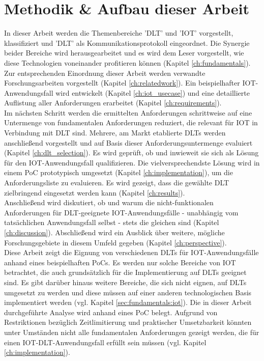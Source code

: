\section{Methodik \& Aufbau dieser Arbeit}
\label{sec:intro:methodology}
In dieser Arbeit werden die Themenbereiche '\ac{DLT}' und '\ac{IOT}' vorgestellt, klassifiziert und '\ac{DLT}' als Kommunikationsprotokoll eingeordnet. Die Synergie beider Bereiche wird herausgearbeitet und es wird dem Leser vorgestellt, wie diese Technologien voneinander profitieren können (Kapitel \ref{ch:fundamentals}).\\
Zur entsprechenden Einordnung dieser Arbeit werden verwandte Forschungsarbeiten vorgestellt (Kapitel \ref{ch:relatedwork}). Ein beispielhafter \ac{IOT}-Anwendungsfall wird entwickelt (Kapitel \ref{ch:iot_usecase}) und eine detaillierte Auflistung aller Anforderungen erarbeitet (Kapitel \ref{ch:requirements}).\\
Im nächsten Schritt werden die ermittelten Anforderungen schrittweise auf eine Untermenge von fundamentalen Anforderungen reduziert, die relevant für \ac{IOT} in Verbindung mit \ac{DLT} sind. Mehrere, am Markt etablierte \ac{DLT}s werden anschließend vorgestellt und auf Basis dieser Anforderungsuntermenge evaluiert (Kapitel \ref{ch:dlt_selection}). Es wird geprüft, ob und inwieweit sie sich als Lösung für den \ac{IOT}-Anwendungsfall qualifizieren. Die vielversprechendste Lösung wird in einem \ac{PoC} prototypisch umgesetzt (Kapitel \ref{ch:implementation}), um die Anforderungsliste zu evaluieren. Es wird gezeigt, dass die gewählte \ac{DLT} zielbringend eingesetzt werden kann (Kapitel \ref{ch:results}).\\
Anschließend wird diskutiert, ob und warum die nicht-funktionalen Anforderungen für \ac{DLT}-geeignete \ac{IOT}-Anwendungsfälle - unabhängig vom tatsächlichen Anwendungsfall selbst - stets die gleichen sind (Kapitel \ref{ch:discussion}). Abschließend wird ein Ausblick über weitere, mögliche Forschungsgebiete in diesem Umfeld gegeben (Kapitel \ref{ch:perspective}).\\

Diese Arbeit zeigt die Eignung von verschiedenen \ac{DLT}s für \ac{IOT}-Anwendungsfälle anhand eines beispielhaften \ac{PoC}s. Es werden nur solche Bereiche von \ac{IOT} betrachtet, die auch grundsätzlich für die Implementierung auf \ac{DLT}s geeignet sind. Es gibt darüber hinaus weitere Bereiche, die sich nicht eignen, auf \ac{DLT}s umgesetzt zu werden und diese müssen auf einer anderen technologischen Basis implementiert werden (vgl. Kapitel \ref{sec:fundamentals:iot}). Die in dieser Arbeit durchgeführte Analyse wird anhand eines \ac{PoC} belegt. Aufgrund von Restriktionen bezüglich Zeitlimitierung und praktischer Umsetzbarkeit könnten unter Umständen nicht alle fundamentalen Anforderungen gezeigt werden, die für einen \ac{IOT}-\ac{DLT}-Anwendungsfall erfüllt sein müssen (vgl. Kapitel \ref{ch:implementation}).

